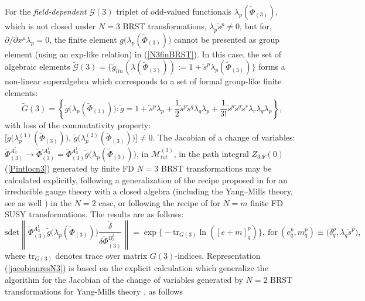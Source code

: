 \documentclass[10pt]{article}
\begin{document}
For the \emph{field-dependent}  $\mathcal{G}(3)$ triplet of odd-valued functionals $\lambda_p(\widetilde{\Phi}_{(3)})$,
which is not closed under $N=3$ BRST transformations, $\lambda_p \overleftarrow{s}{}^p \ne 0$, but
for, $\partial/\partial x^\mu  \lambda_p = 0$,  the  finite element $g\big(\lambda_p(\widetilde{\Phi}_{(3)})\big)$ cannot be presented as group element (using an exp-like relation) in (\ref{N3finBRST}). In this case, the set of algebraic elements
$\widetilde{\mathcal{G}}(3) =\big\{\tilde{g}_{lin}(\lambda (\widetilde{\Phi}_{(3)})):=1+\overleftarrow{s}^p\lambda_p(\widetilde{\Phi}_{(3)})\big\}$
forms a non-linear superalgebra which corresponds to a set of formal group-like finite elements:
\begin{equation}
\tilde{G}(3)=\left\{ \tilde{g}\big(\lambda_p(\widetilde{\Phi}_{(3)})\big):\tilde{g}=1+ \overleftarrow{s}{}^p\lambda_p + \frac{1}{2}\overleftarrow{s}{}^p\overleftarrow{s}{}^q \lambda_q\lambda_p+ \frac{1}{3!}\overleftarrow{s}{}^p\overleftarrow{s}{}^q \overleftarrow{s}{}^r \lambda_r\lambda_q\lambda_p\right\} ,
\label{tildeG3}
\end{equation}
with loss of the commutativity property: $\big[\tilde{g}\big(\lambda^{(1)}_p(\widetilde{\Phi}_{(3)})\big),\,\tilde{g}\big(\lambda^{(2)}_p(\widetilde{\Phi}_{(3)})\big)\big] \ne 0$.
The Jacobian of a change of variables:
$\widetilde{\Phi}{}^{A^t_3}_{(3)}\to \widetilde{\Phi}{}^{\prime A^t_3}_{(3)}=
\widetilde{\Phi}{}^{A^t_3}_{(3)}\tilde{g}\big(\lambda_p(\widetilde{\Phi}_{(3)})\big)$, in $\mathcal{M}^{(3)}_{tot}$, in the path integral ${Z}_{3|\Psi}(0)$ (\ref{Pintlocn3}) %
generated by finite FD  $N=3$ BRST transformations may be calculated
explicitly, following a generalization of the recipe proposed in \cite{re1}
for an irreducible gauge theory with a closed algebra (including the Yang--Mills theory, see as well \cite{MR5})
in the $N=2$ case, or following the recipe of \cite{UMR} for $N=m$ finite
FD SUSY transformations. The results are as follows:
\begin{equation}
\mathrm{sdet}\left\|\widetilde{\Phi}{}^{A^t_3}_{(3)}\tilde{g}\big(\lambda_p(\widetilde{\Phi}_{(3)})\big)\frac{\overleftarrow{\delta}}{\delta \widetilde{\Phi}{}^{B^t_3}_{(3)}} \right\| = \exp \Big\{-\mathrm{tr}_{G(3)}\ln \left( [e+m]^p_q\right) \Big\}, \ \mathrm{for} \ (e^p_q, m^p_q)\equiv \big(\delta^p_q, \lambda_q \overleftarrow{s}^p\big),
\label{jacobianresN3}
\end{equation}%
where $\mathrm{tr}_{G(3)}$ denotes  trace over matrix $G(3)$-indices.
Representation (\ref{jacobianresN3}) is based on the explicit calculation which generalize the algorithm for the Jacobian of the change of variables generated by  $N=2$ BRST transformations for Yang-Mills theory \cite{MR5}, \cite{reshmosh} as follows
\end{document}
